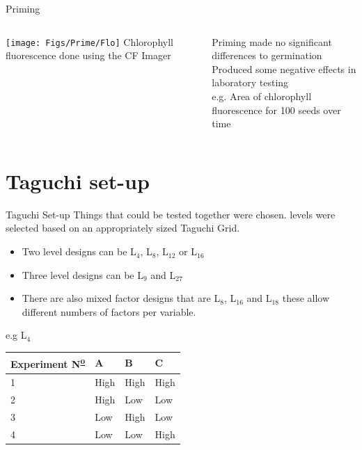 \documentclass[10pt]{beamer}
\begin{document}
{%
\begin{frame}{Priming}
  \begin{columns}[T]
    \begin{column}{.5\textwidth}
      \texttt{[image: Figs/Prime/Flo]}
      \vspace{2mm}
      \small{Chlorophyll fluorescence done using the CF Imager}
    \end{column}
    \begin{column}{.5\textwidth}
      	Priming made no significant differences to germination \\ \vspace{5mm}
      	Produced some negative effects in laboratory testing\\ \vspace{5mm}
        e.g. Area of chlorophyll fluorescence for 100 seeds over time \\ \vspace{5mm}
    \end{column}
  \end{columns}
\end{frame}
}



\section{Taguchi set-up}



\begin{frame}{Taguchi Set-up}
	Things that could be tested together were chosen.\newline
	levels were selected based on an appropriately sized Taguchi Grid.
	\begin{itemize}
	\item Two level designs can be  L$_{4}$, L$_{8}$,  L$_{12}$ or L$_{16}$
	\item Three level designs can be  L$_{9}$ and L$_{27}$
	\item There are also mixed factor designs that are L$_{8}$, L$_{16}$ and L$_{18}$ these allow different numbers of factors per variable. 
	\end{itemize}
\pause
e.g L$_4$ 
\begin{table}[htpb]\scriptsize
\centering
\begin{tabular}{p{2cm} |  p{1cm}   p{1cm}  p{1cm}}
\hline
\textbf{Experiment N\textsuperscript{\underline{o}}} & \textbf{A}   & \textbf{B}  & \textbf{C}  \\
\hline
1 & High  & High & High\\
2 & High  & Low & Low\\
3 & Low  & High & Low\\
4 & Low  & Low & High\\
\hline
\end{tabular}
\end{table}
\end{frame}
\end{document}
